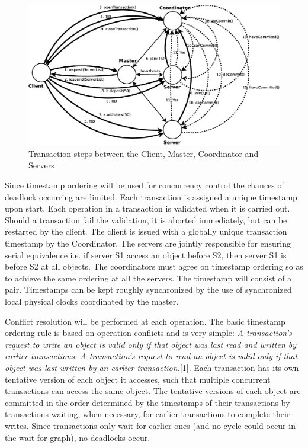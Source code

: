 \documentclass[times, 10pt,twocolumn]{article}
\begin{document}
\begin{figure}
\centering
\includegraphics[scale=0.2]{transaction.eps}
\caption{Transaction steps between the Client, Master, Coordinator and Servers}
\label{fig:transa}
\end{figure}



\label{subsec:dldetect}
Since timestamp ordering will be used for concurrency control the chances of deadlock occurring are limited.
Each transaction is assigned a unique timestamp upon start. Each operation in a transaction is validated when it is carried out.
Should a transaction fail the validation, it is aborted immediately, but can be restarted by the client. The client is issued with a globally unique transaction timestamp by the Coordinator. The servers are jointly responsible for ensuring serial equivalence i.e. if server S1 access an object before S2, then server S1 is before S2 at all objects. The coordinators must agree on timestamp ordering so as to achieve the same ordering at all the servers. The timestamp will consist of a {\it <local timestamp, server-id> } pair. Timestamps can be kept roughly synchronized by the use of synchronized local physical clocks coordinated by the master.

Conflict resolution will be performed at each operation.
The basic timestamp ordering rule is based on operation conflicts and is very simple:
{\it A transaction’s request to write an object is valid only if that object was last read and written by earlier transactions. A transaction’s request to read an object is valid only if that object was
last written by an earlier transaction.}[1]. Each transaction has its own tentative version of each object it accesses, such that multiple concurrent transactions can access the same object. The tentative
versions of each object are committed in the order determined by the timestamps of their transactions by transactions waiting, when necessary, for earlier transactions to complete their writes.
Since transactions only wait for earlier ones (and no cycle could occur in the wait-for graph), no deadlocks occur.
\end{document}
